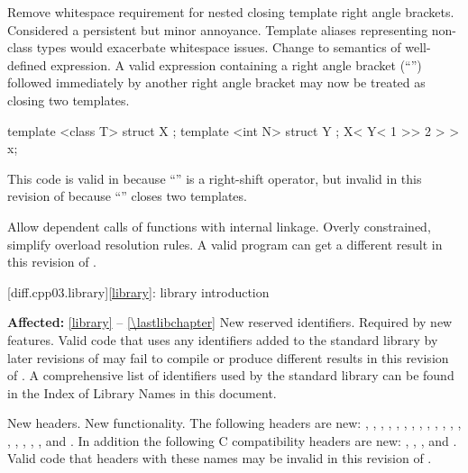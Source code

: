 \change
Remove whitespace requirement for nested closing template right angle
brackets.
\rationale
Considered a persistent but minor annoyance. Template aliases
representing non-class types would exacerbate whitespace issues.
\effect
Change to semantics of well-defined expression. A valid \CppIII{} expression
containing a right angle bracket (``\tcode{>}'') followed immediately by
another right angle bracket may now be treated as closing two templates.
\begin{example}
\begin{codeblock}
template <class T> struct X { };
template <int N> struct Y { };
X< Y< 1 >> 2 > > x;
\end{codeblock}
This code is valid in \CppIII{} because ``\tcode{>>}''
is a right-shift operator, but invalid in this revision of \Cpp{} because
``\tcode{>>}'' closes two templates.
\end{example}

\change
Allow dependent calls of functions with internal linkage.
\rationale
Overly constrained, simplify overload resolution rules.
\effect
A valid \CppIII{} program can get a different result in this
revision of \Cpp{}.

[diff.cpp03.library]{\ref*{library}: library introduction}

\pnum
\textbf{Affected:} \ref{library} -- \ref{\lastlibchapter}
\change
New reserved identifiers.
\rationale
Required by new features.
\effect
Valid \CppIII{} code that uses any identifiers added to the \Cpp{} standard
library by later revisions of \Cpp{} may fail to compile or produce different
results in this revision of \Cpp{}. A comprehensive list of identifiers used
by the \Cpp{} standard library can be found in the Index of Library Names in this
document.

\change
New headers.
\rationale
New functionality.
\effect
The following \Cpp{} headers are new:
,
,
,
,
,
,
,
,
,
,
,
,
,
,
,
,
,
,
and
.
In addition the following C compatibility headers are new:
,
,
,
and
.
Valid \CppIII{} code that  headers with these names may be
invalid in this revision of \Cpp{}.

